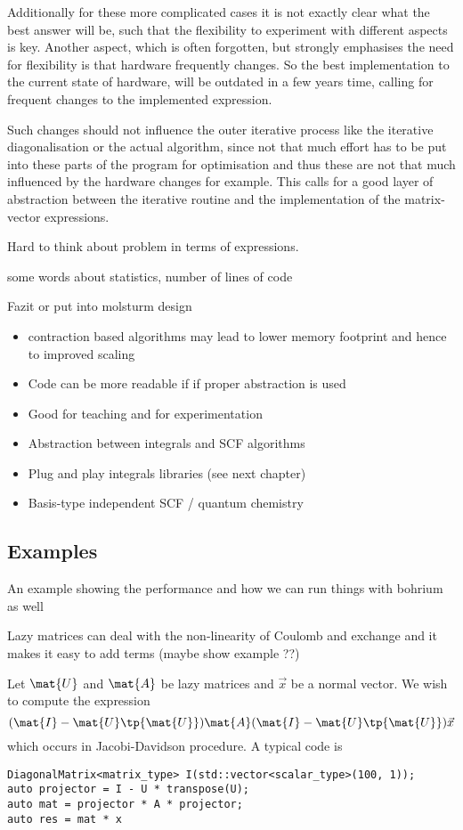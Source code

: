 
Additionally for these more complicated cases
it is not exactly clear what the best answer will be,
such that the flexibility to experiment with different aspects is key.
Another aspect, which is often forgotten,
but strongly emphasises the need for flexibility
is that hardware frequently changes.
So the best implementation to the current state of hardware,
will be outdated in a few years time,
calling for frequent changes to the implemented \contraction expression.

Such changes should not influence the outer iterative process
like the iterative diagonalisation or the actual \SCF algorithm,
since not that much effort has to be put into these parts
of the program for optimisation
and thus these are not that much influenced by the hardware changes for example.
This calls for a good layer of abstraction between the
iterative routine and the implementation of the matrix-vector \contraction expressions.

Hard to think about problem in terms of expressions.



some words about statistics,
number of lines of code





Fazit or put into molsturm design
\begin{itemize}
	\item contraction based algorithms may lead to lower memory footprint and
		hence to improved scaling
	\item Code can be more readable if if proper abstraction is used
	\item Good for teaching and for experimentation
	\item Abstraction between integrals and SCF algorithms
	\item Plug and play integrals libraries (see next chapter)
	\item Basis-type independent SCF / quantum chemistry
\end{itemize}




\subsection{Examples}
An example showing the performance and how we can run things with bohrium as well


Lazy matrices can deal with the non-linearity of Coulomb and exchange
and it makes it easy to add terms (maybe show example ??)

Let $\mat{U}$ and $\mat{A}$ be lazy matrices and $\vec{x}$ be a normal vector.
We wish to compute the expression
\[ (\mat{I} - \mat{U} \tp{\mat{U}}) \mat{A} (\mat{I} - \mat{U} \tp{\mat{U}}) \vec{x} \]
which occurs in Jacobi-Davidson procedure.
A typical code is
\begin{lstlisting}
DiagonalMatrix<matrix_type> I(std::vector<scalar_type>(100, 1));
auto projector = I - U * transpose(U);
auto mat = projector * A * projector;
auto res = mat * x
\end{lstlisting}
